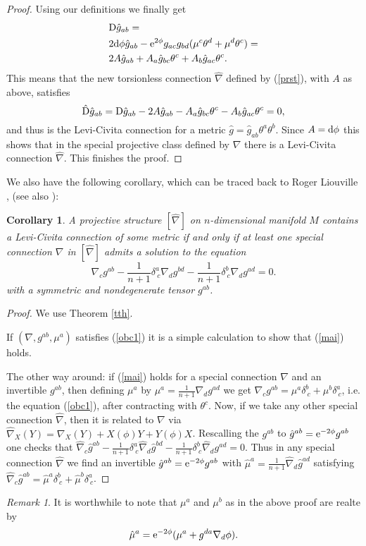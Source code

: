 \documentclass[letterpaper]{amsart}
\newtheorem{corollary}[theorem]{Corollary}
\theoremstyle{definition}
\theoremstyle{remark}
\newtheorem{remark}[theorem]{Remark}
\newcommand{\be}{\begin{equation}}
\newcommand{\ee}{\end{equation}}
\newcommand{\D}{{\rm D}}
\newcommand{\der}{{\rm d}}
\begin{document}
\begin{proof}
Using our definitions we finally get
$$\begin{aligned}
&\D \hat{g}_{ab}=\\
&2\der\phi\hat{g}_{ab}-{\rm
    e}^{2\phi}g_{ac}g_{bd}(\mu^c\theta^d+\mu^d\theta^c)=\\
&2A\hat{g}_{ab}+A_a\hat{g}_{bc}\theta^c+A_b\hat{g}_{ac}\theta^c.
\end{aligned}
$$
This means that the new torsionless connection $\hat{\nabla}$ defined
by (\ref{prst}), with $A$ as above, satisfies  
$$\hat{\D}\hat{g}_{ab}=\D
\hat{g}_{ab}-2A\hat{g}_{ab}-A_a\hat{g}_{bc}\theta^c-A_b\hat{g}_{ac}\theta^c=0,$$ 
and thus is the Levi-Civita connection
for a metric $\hat{g}=\hat{g}_{ab}\theta^a\theta^b$. Since
$A=\der\phi$ this shows that in the special projective class defined
by $\nabla$ there is a Levi-Civita connection $\hat{\nabla}$. This
finishes the proof.  
\end{proof} 
 We also have the following corollary, which can be traced back to 
Roger Liouville \cite{liu}, (see also \cite{bde,ema,mik,sin}):  
\begin{corollary}
A projective structure $[\hat{\nabla}]$ on $n$-dimensional manifold $M$
contains a Levi-Civita connection of some 
metric if and only if at least one special connection $\nabla$ in
$[\hat{\nabla}]$  
admits a solution to the equation 
\be
\nabla_cg^{ab}-\frac{1}{n+1}\delta^a_{~c}\nabla_dg^{bd}-\frac{1}{n+1}\delta^b_{~c}\nabla_dg^{ad}=0.\label{mai}
\ee
with a symmetric and nondegenerate tensor $g^{ab}$.
\end{corollary} 
\begin{proof}
We use Theorem \ref{tth}. 

If $(\nabla,g^{ab},\mu^a)$ satisfies
(\ref{obc1}) it is a simple calculation to show that (\ref{mai})
holds. 

The other way around: if (\ref{mai}) holds for a special connection
$\nabla$ and an invertible $g^{ab}$, then defining $\mu^a$ by 
$\mu^a=\frac{1}{n+1}\nabla_dg^{ad}$ we get $\nabla_c
g^{ab}=\mu^a\delta^b_{~c}+\mu^b\delta^a_{~c}$, i.e. the equation
(\ref{obc1}), 
after contracting with $\theta^c$. Now, if we take any other special
connection $\hat{\nabla}$, then it is related to 
$\nabla$ via
$\hat{\nabla}_X(Y)=\nabla_X(Y)+X(\phi)Y+Y(\phi)X$. Rescalling the
$g^{ab}$ to 
$\hat{g}^{ab}={\rm e}^{-2\phi}g^{ab}$ one checks that 
$\hat{\nabla}_c\hat{g}^{ab}-\frac{1}{n+1}\delta^a_{~c}\hat{\nabla}_d\hat{g}^{bd}-\frac{1}{n+1}\delta^b_{~c}\hat{\nabla}_dg^{ad}=0$. Thus
in any special connection $\hat{\nabla}$ we find an invertible
$\hat{g}^{ab}={\rm e}^{-2\phi}g^{ab}$ with
$\hat{\mu}^a=\tfrac{1}{n+1}\hat{\nabla}_d\hat{g}^{ad}$ satisfying
$\hat{\nabla}_c\hat{g}^{ab}=\hat{\mu}^a\delta^b_{~c}+\hat{\mu}^b\delta^a_{~c}$. 
\end{proof}
\begin{remark}
It is worthwhile to note that $\mu^a$ and $\mu^b$ as in the above
proof are realte by
$$\hat{\mu}^a={\rm
  e}^{-2\phi}(\mu^a+ g^{da}\nabla_d\phi).$$
\end{remark}
\end{document}
